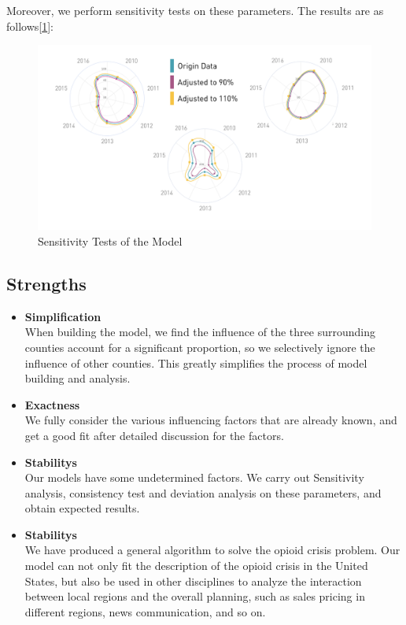 \documentclass{mcmthesis}
\begin{document}
Moreover, we perform sensitivity tests on these parameters.  The results are as follows[\ref{model_sensitivity}]:
\begin{figure}[h]
	\centering
	\includegraphics[width=15cm]{figure-release/Model.Sensitivity.png}
	\caption{Sensitivity Tests of the Model}\label{model_sensitivity}
\end{figure}

\subsection{Strengths}
\begin{itemize}
	\item \textbf{Simplification}\\
	When building the model, we find the influence of the three surrounding counties account for a significant proportion, so we selectively ignore the influence of other counties. This greatly simplifies the process of model building and analysis.
	\item \textbf{Exactness}\\
	We fully consider the various influencing factors that are already known, and get a good fit after detailed discussion for the factors.
	\item \textbf{Stabilitys}\\
	Our models have some undetermined factors. We carry out Sensitivity analysis, consistency test and deviation analysis on these parameters, and obtain expected results.
	\item \textbf{Stabilitys}\\
	We have produced a general algorithm to solve the opioid crisis problem. Our model can not only fit the description of the opioid crisis in the United States, but also be used in other disciplines to analyze the interaction between local regions and the overall planning, such as sales pricing in different regions, news communication, and so on.
\end{itemize}
\end{document}
